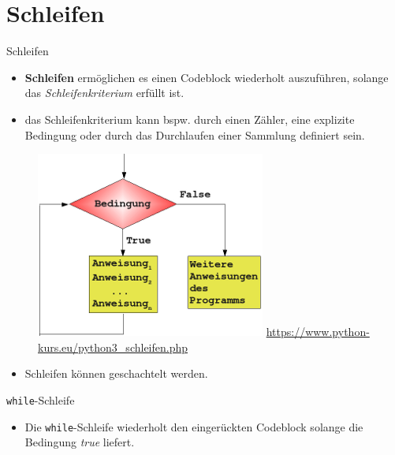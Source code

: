 \documentclass[utf8, smaller, c]{beamer}
\renewcommand{\tt}[1]{{\texttt{#1}}}
\begin{document}
\section{Schleifen}
\begin{frame}{Schleifen}
	\begin{itemize}
		\item \textbf{Schleifen} ermöglichen es einen Codeblock wiederholt auszuführen, solange das \textit{Schleifenkriterium} erfüllt ist.
	\end{itemize}
	\begin{minipage}[h]{0.4\textwidth}
		\begin{itemize}
			\item das Schleifenkriterium kann bspw. durch einen Zähler, eine explizite Bedingung oder durch das Durchlaufen einer Sammlung definiert sein.
		\end{itemize}
	\end{minipage}
	\hfill
	\begin{minipage}[h]{0.58\textwidth}
		\begin{figure}[hb]
		    \centering
			\includegraphics[scale=0.6]{pics/schleife1.png}
			{\tiny\url{https://www.python-kurs.eu/python3_schleifen.php}}
		\end{figure}
	\end{minipage}
	\begin{itemize}
		\item Schleifen können geschachtelt werden.
	\end{itemize}
	\pagebreak
	\begin{block}{\tt{while}-Schleife}
		\begin{itemize}
			\item Die \tt{while}-Schleife wiederholt den eingerückten Codeblock solange die Bedingung \textit{true} liefert.

\end{itemize}
\end{block}
\end{frame}
\end{document}
